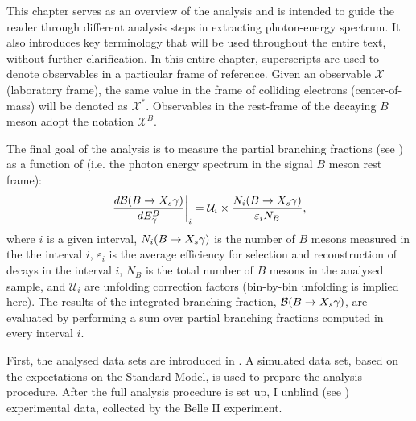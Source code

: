 This chapter serves as an overview of the analysis
and is intended to guide the reader through different analysis steps in extracting \BtoXsgamma photon-energy spectrum.
It also introduces key terminology that will be used throughout the entire text, without further clarification.
In this entire chapter, superscripts are used to denote observables in a particular frame of reference.
Given an observable $\mathcal{X}$ (laboratory frame), the same value in the frame of colliding electrons (center-of-mass) will be denoted as $\mathcal{X}^*$.
Observables in the rest-frame of the decaying $B$ meson adopt the notation $\mathcal{X}^B$.

The final goal of the analysis is to measure the partial branching fractions (see )
as a function of \EB (i.e. the photon energy spectrum in the signal $B$ meson rest frame):
\begin{equation}\label{eq:branching_fraction_recipe}
    \left.\frac{d\mathcal{B}(\BtoXsgamma)}{d\EB}\right|_i = \mathcal{U}_i \times \frac{N_i(\BtoXsgamma)}{\varepsilon_i N_{B}},
\end{equation}
where $i$ is a given \EB interval,
$N_i(\BtoXsgamma)$ is the number of $B$ mesons measured in the the interval $i$, 
$\varepsilon_i$ is the average efficiency for selection and reconstruction of \BtoXsgamma decays in the interval $i$,
$N_B$ is the total number of $B$ mesons in the analysed sample,
and $\mathcal{U}_i$ are unfolding correction factors (bin-by-bin unfolding is implied here).
The results of the integrated branching fraction, $\mathcal{B}(\BtoXsgamma)$, are evaluated by performing a sum over partial branching fractions computed in every interval $i$.

First, the analysed data sets are introduced in .
A simulated data set, based on the expectations on the Standard Model, is used to prepare the analysis procedure.
After the full analysis procedure is set up, I unblind (see ) experimental data, collected by the Belle II experiment.

